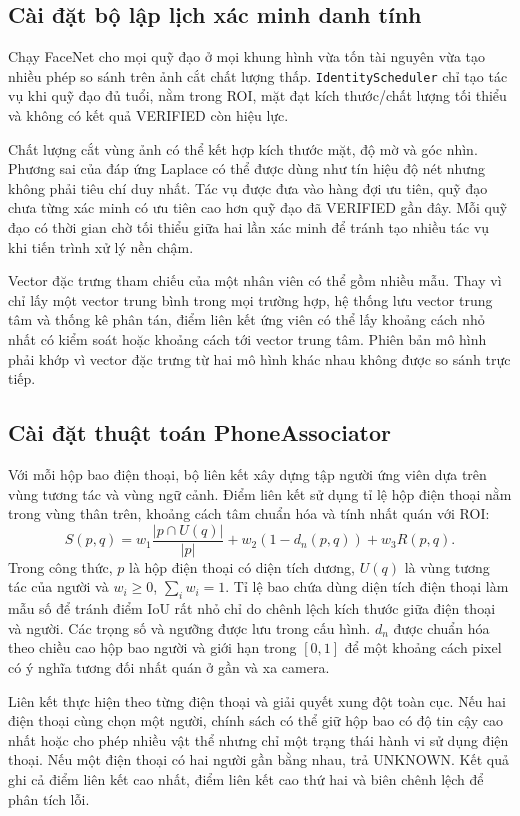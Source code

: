 \subsection{Cài đặt bộ lập lịch xác minh danh tính}
Chạy FaceNet cho mọi quỹ đạo ở mọi khung hình vừa tốn tài nguyên vừa tạo nhiều phép so sánh trên ảnh cắt chất lượng thấp. \texttt{IdentityScheduler} chỉ tạo tác vụ khi quỹ đạo đủ tuổi, nằm trong ROI, mặt đạt kích thước/chất lượng tối thiểu và không có kết quả VERIFIED còn hiệu lực.

Chất lượng cắt vùng ảnh có thể kết hợp kích thước mặt, độ mờ và góc nhìn. Phương sai của đáp ứng Laplace có thể được dùng như tín hiệu độ nét nhưng không phải tiêu chí duy nhất. Tác vụ được đưa vào hàng đợi ưu tiên, quỹ đạo chưa từng xác minh có ưu tiên cao hơn quỹ đạo đã VERIFIED gần đây. Mỗi quỹ đạo có thời gian chờ tối thiểu giữa hai lần xác minh để tránh tạo nhiều tác vụ khi tiến trình xử lý nền chậm.

Vector đặc trưng tham chiếu của một nhân viên có thể gồm nhiều mẫu. Thay vì chỉ lấy một vector trung bình trong mọi trường hợp, hệ thống lưu vector trung tâm và thống kê phân tán, điểm liên kết ứng viên có thể lấy khoảng cách nhỏ nhất có kiểm soát hoặc khoảng cách tới vector trung tâm. Phiên bản mô hình phải khớp vì vector đặc trưng từ hai mô hình khác nhau không được so sánh trực tiếp.

\subsection{Cài đặt thuật toán PhoneAssociator}
Với mỗi hộp bao điện thoại, bộ liên kết xây dựng tập người ứng viên dựa trên vùng tương tác và vùng ngữ cảnh. Điểm liên kết sử dụng tỉ lệ hộp điện thoại nằm trong vùng thân trên, khoảng cách tâm chuẩn hóa và tính nhất quán với ROI:
\begin{equation}
 S(p,q)=w_1\frac{|p\cap U(q)|}{|p|}+w_2(1-d_n(p,q))+w_3R(p,q).
\end{equation}
Trong công thức, $p$ là hộp điện thoại có diện tích dương, $U(q)$ là vùng tương tác của người và $w_i\geq0$, $\sum_iw_i=1$. Tỉ lệ bao chứa dùng diện tích điện thoại làm mẫu số để tránh điểm IoU rất nhỏ chỉ do chênh lệch kích thước giữa điện thoại và người. Các trọng số và ngưỡng được lưu trong cấu hình. $d_n$ được chuẩn hóa theo chiều cao hộp bao người và giới hạn trong $[0,1]$ để một khoảng cách pixel có ý nghĩa tương đối nhất quán ở gần và xa camera.

Liên kết thực hiện theo từng điện thoại và giải quyết xung đột toàn cục. Nếu hai điện thoại cùng chọn một người, chính sách có thể giữ hộp bao có độ tin cậy cao nhất hoặc cho phép nhiều vật thể nhưng chỉ một trạng thái hành vi sử dụng điện thoại. Nếu một điện thoại có hai người gần bằng nhau, trả UNKNOWN. Kết quả ghi cả điểm liên kết cao nhất, điểm liên kết cao thứ hai và biên chênh lệch để phân tích lỗi.

